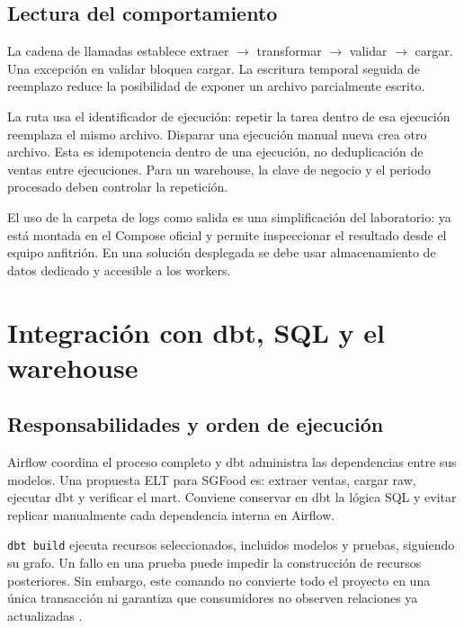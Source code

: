 \documentclass[12pt]{article}
\begin{document}
\subsection{Lectura del comportamiento}
La cadena de llamadas establece extraer $\rightarrow$ transformar $\rightarrow$ validar $\rightarrow$ cargar. Una excepción en validar bloquea cargar. La escritura temporal seguida de reemplazo reduce la posibilidad de exponer un archivo parcialmente escrito.

La ruta usa el identificador de ejecución: repetir la tarea dentro de esa ejecución reemplaza el mismo archivo. Disparar una ejecución manual nueva crea otro archivo. Esta es idempotencia dentro de una ejecución, no deduplicación de ventas entre ejecuciones. Para un warehouse, la clave de negocio y el periodo procesado deben controlar la repetición.

El uso de la carpeta de logs como salida es una simplificación del laboratorio: ya está montada en el Compose oficial y permite inspeccionar el resultado desde el equipo anfitrión. En una solución desplegada se debe usar almacenamiento de datos dedicado y accesible a los workers.

\section{Integración con dbt, SQL y el warehouse}
\subsection{Responsabilidades y orden de ejecución}
Airflow coordina el proceso completo y dbt administra las dependencias entre sus modelos. Una propuesta ELT para SGFood es: extraer ventas, cargar raw, ejecutar dbt y verificar el mart. Conviene conservar en dbt la lógica SQL y evitar replicar manualmente cada dependencia interna en Airflow.

\texttt{dbt build} ejecuta recursos seleccionados, incluidos modelos y pruebas, siguiendo su grafo. Un fallo en una prueba puede impedir la construcción de recursos posteriores. Sin embargo, este comando no convierte todo el proyecto en una única transacción ni garantiza que consumidores no observen relaciones ya actualizadas \cite{dbt_build}.
\end{document}

